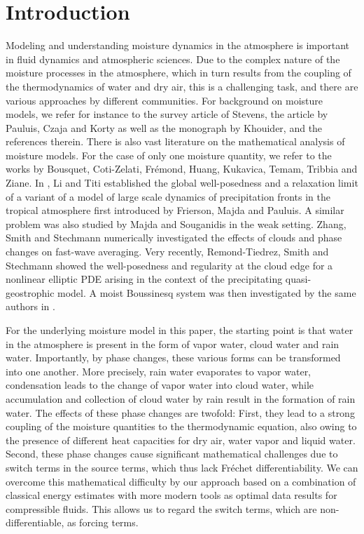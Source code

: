 \documentclass[10pt]{amsart}
\theoremstyle{plain}
\theoremstyle{definition}
\theoremstyle{thm}
\numberwithin{equation}{section}
\begin{document}
\maketitle

\section{Introduction}\label{sec:intro}

Modeling and understanding moisture dynamics in the atmosphere is important in fluid dynamics and atmospheric sciences.
Due to the complex nature of the moisture processes in the atmosphere, which in turn results from the coupling of the thermodynamics of water and dry air, this is a challenging task, and there are various approaches by different communities.
For background on moisture models, we refer for instance to the survey article of Stevens\cite{Ste:05}, the article by Pauluis, Czaja and Korty\cite{PCK:08} as well as the monograph by Khouider\cite{Kho:19}, and the references therein.
There is also vast literature on the mathematical analysis of moisture models.
For the case of only one moisture quantity, we refer to the works by Bousquet, Coti-Zelati, Fr\'emond, Huang, Kukavica, Temam, Tribbia and Ziane\cite{BCZT:14,CZFTT:13,CZHKTZ:15,CZT:12}. 
In \cite{LT:16}, Li and Titi established the global well-posedness and a relaxation limit of a variant of a model of large scale dynamics of precipitation fronts in the tropical atmosphere first introduced by Frierson, Majda and Pauluis\cite{FMP:04}.
A similar problem was also studied by Majda and Souganidis\cite{MS:10} in the weak setting.
Zhang, Smith and Stechmann\cite{ZSS:21} numerically investigated the effects of clouds and phase changes on fast-wave averaging.
Very recently, Remond-Tiedrez, Smith and Stechmann\cite{RTSS:24a} showed the well-posedness and regularity at the cloud edge for a nonlinear elliptic PDE arising in the context of the precipitating quasi-geostrophic model.
A moist Boussinesq system was then investigated by the same authors in \cite{RTSS:24b}.

For the underlying moisture model in this paper, the starting point is that water in the atmosphere is present in the form of vapor water, cloud water and rain water.
Importantly, by phase changes, these various forms can be transformed into one another.
More precisely, rain water evaporates to vapor water, condensation leads to the change of vapor water into cloud water, while accumulation and collection of cloud water by rain result in the formation of rain water.
The effects of these phase changes are twofold:
First, they lead to a strong coupling of the moisture quantities to the thermodynamic equation, also owing to the presence of different heat capacities for dry air, water vapor and liquid water.
Second, these phase changes cause significant mathematical challenges due to switch terms in the source terms, which thus lack Fr\'echet differentiability.
We can overcome this mathematical difficulty by our approach based on a combination of classical energy estimates with more modern tools as optimal data results for compressible fluids.
This allows us to regard the switch terms, which are non-differentiable, as forcing terms.
\end{document}
